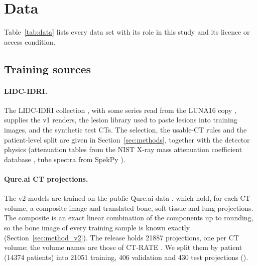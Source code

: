\section{Data}
\label{sec:data}
Table~\ref{tab:data} lists every data set with its role in this study and its licence or access condition.

\subsection{Training sources}
\paragraph{LIDC-IDRI.} The LIDC-IDRI collection \citep{armato2011lidc,armato2015lidctcia,clark2013tcia}, with some series read from the LUNA16 copy
\citep{setio2017luna16}, supplies the v1 renders, the lesion library used to paste lesions into training images, and the synthetic test CTs. The
selection, the usable-CT rules and the patient-level split are given in Section~\ref{sec:methods}, together with the detector physics (attenuation
tables from the NIST X-ray mass attenuation coefficient database \citep{hubbell2004xraymass}, tube spectra from SpekPy \citep{poludniowski2021spekpy}).

\paragraph{Qure.ai CT projections.} The v2 models are trained on the public Qure.ai  data \citep{angaitkar2026anatomy}, which
hold, for each CT volume, a composite image and translated bone, soft-tissue and lung projections. The composite is an exact linear combination of
the components up to rounding, so the bone image of every training sample is known exactly (Section~\ref{sec:method_v2}).
The release holds \num{21887} projections, one per CT volume; the volume names are those of CT-RATE \citep{hamamci2026ctrate}. We split them by
patient (\num{14374} patients) into \num{21051} training, 406 validation and 430 test projections ().

